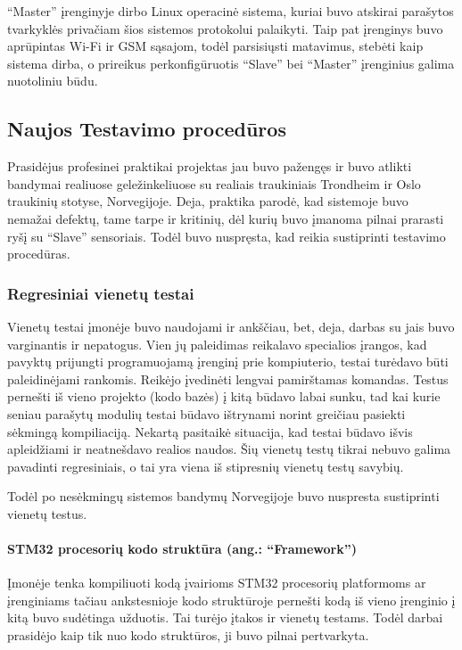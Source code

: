 \documentclass[12pt, a4paper, lithuanian, final]{article}
\begin{document}
"`Master"' įrenginyje dirbo Linux operacinė sistema, kuriai buvo atskirai parašytos tvarkyklės privačiam šios sistemos protokolui palaikyti.
Taip pat įrenginys buvo aprūpintas Wi-Fi ir GSM sąsajom, todėl parsisiųsti matavimus, stebėti kaip sistema dirba, o prireikus perkonfigūruotis "`Slave"' bei "`Master"' įrenginius galima nuotoliniu būdu.



\subsection{Naujos Testavimo procedūros}

Prasidėjus profesinei praktikai projektas jau buvo pažengęs ir buvo atlikti bandymai realiuose geležinkeliuose su realiais traukiniais Trondheim ir Oslo traukinių stotyse, Norvegijoje.
Deja, praktika parodė, kad sistemoje buvo nemažai defektų, tame tarpe ir kritinių, dėl kurių buvo įmanoma pilnai prarasti ryšį su "`Slave"' sensoriais.
Todėl buvo nuspręsta, kad reikia sustiprinti testavimo procedūras.

\subsubsection{Regresiniai vienetų testai}

Vienetų testai įmonėje buvo naudojami ir ankščiau, bet, deja, darbas su jais buvo varginantis ir nepatogus.
Vien jų paleidimas reikalavo specialios įrangos, kad pavyktų prijungti programuojamą įrenginį prie kompiuterio,
testai turėdavo būti paleidinėjami rankomis. Reikėjo įvedinėti lengvai pamirštamas komandas.
Testus pernešti iš vieno projekto (kodo bazės) į kitą būdavo labai sunku, tad kai kurie seniau parašytų modulių testai būdavo ištrynami norint greičiau pasiekti sėkmingą kompiliaciją.
Nekartą pasitaikė situacija, kad testai būdavo išvis apleidžiami ir neatnešdavo realios naudos.
Šių vienetų testų tikrai nebuvo galima pavadinti regresiniais, o tai yra viena iš stipresnių vienetų testų savybių.

Todėl po nesėkmingų sistemos bandymų Norvegijoje buvo nuspresta sustiprinti vienetų testus.

\paragraph{STM32 procesorių kodo struktūra (ang.: "`Framework"')}

Įmonėje tenka kompiliuoti kodą įvairioms STM32 procesorių platformoms ar įrenginiams tačiau ankstesnioje kodo struktūroje pernešti kodą iš vieno įrenginio į kitą buvo sudėtinga užduotis.
Tai turėjo įtakos ir vienetų testams.
Todėl darbai prasidėjo kaip tik nuo kodo struktūros, ji buvo pilnai pertvarkyta.
\end{document}
